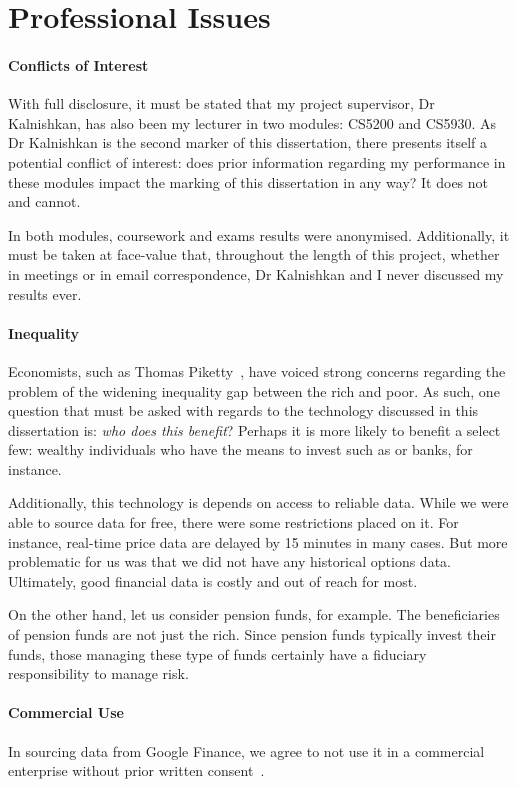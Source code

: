 \documentclass[../Dissertation.tex]{subfiles}
\begin{document}
\section{Professional Issues}

\paragraph{Conflicts of Interest}

With full disclosure, it must be stated that my project supervisor, Dr Kalnishkan, has also been my lecturer in two modules: CS5200 and CS5930. 
As Dr Kalnishkan is the second marker of this dissertation, there presents itself a potential conflict of interest: does prior information regarding my performance in these modules impact the marking of this dissertation in any way?
It does not and cannot. 

In both modules, coursework and exams results were anonymised.
Additionally, it must be taken at face-value that, throughout the length of this project, whether in meetings or in email correspondence, Dr Kalnishkan and I never discussed my results ever.

\paragraph{Inequality}

Economists, such as Thomas Piketty~\cite{Piketty:2014}, have voiced strong concerns regarding the problem of the widening inequality gap between the rich and poor.
As such, one question that must be asked with regards to the technology discussed in this dissertation is: \textit{who does this benefit}?
Perhaps it is more likely to benefit a select few: wealthy individuals who have the means to invest such as or banks, for instance.

Additionally, this technology is depends on access to reliable data.
While we were able to source data for free, there were some restrictions placed on it.
For instance, real-time price data are delayed by 15 minutes in many cases.
But more problematic for us was that we did not have any historical options data.
Ultimately, good financial data is costly and out of reach for most.

On the other hand, let us consider pension funds, for example.
The beneficiaries of pension funds are not just the rich.
Since pension funds typically invest their funds, those managing these type of funds certainly have a fiduciary responsibility to manage risk.

\paragraph{Commercial Use}

In sourcing data from Google Finance, we agree to not use it in a commercial enterprise without prior written consent~\cite{GOOG:Disclaimer}.
\end{document}
